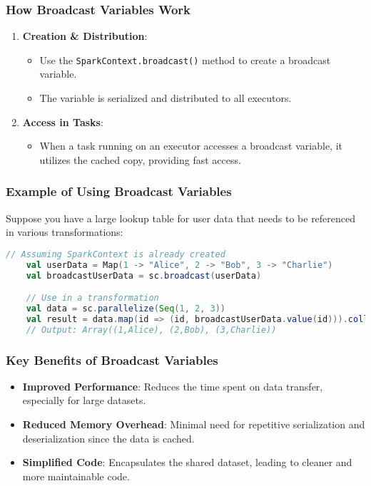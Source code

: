 \documentclass[aspectratio=169]{beamer}
\begin{document}
\begin{frame}[fragile]
    \frametitle{How Broadcast Variables Work}
    \begin{enumerate}
        \item \textbf{Creation \& Distribution}:
        \begin{itemize}
            \item Use the \texttt{SparkContext.broadcast()} method to create a broadcast variable.
            \item The variable is serialized and distributed to all executors.
        \end{itemize}
        
        \item \textbf{Access in Tasks}:
        \begin{itemize}
            \item When a task running on an executor accesses a broadcast variable, it utilizes the cached copy, providing fast access.
        \end{itemize}
    \end{enumerate}
\end{frame}

\begin{frame}[fragile]
    \frametitle{Example of Using Broadcast Variables}
    Suppose you have a large lookup table for user data that needs to be referenced in various transformations:
    \begin{lstlisting}[language=Scala]
    // Assuming SparkContext is already created
    val userData = Map(1 -> "Alice", 2 -> "Bob", 3 -> "Charlie")
    val broadcastUserData = sc.broadcast(userData)

    // Use in a transformation
    val data = sc.parallelize(Seq(1, 2, 3))
    val result = data.map(id => (id, broadcastUserData.value(id))).collect()
    // Output: Array((1,Alice), (2,Bob), (3,Charlie))
    \end{lstlisting}
\end{frame}

\begin{frame}[fragile]
    \frametitle{Key Benefits of Broadcast Variables}
    \begin{itemize}
        \item \textbf{Improved Performance}: Reduces the time spent on data transfer, especially for large datasets.
        \item \textbf{Reduced Memory Overhead}: Minimal need for repetitive serialization and deserialization since the data is cached.
        \item \textbf{Simplified Code}: Encapsulates the shared dataset, leading to cleaner and more maintainable code.
    \end{itemize}
\end{frame}
\end{document}
